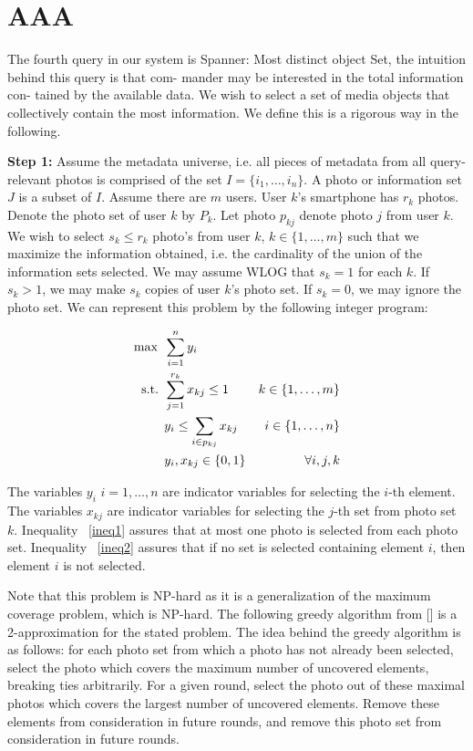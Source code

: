 \section{AAA}
The fourth query in our system is Spanner: Most distinct
object Set, the intuition behind this query is that com-
mander may be interested in the total information con-
tained by the available data. We wish to select a set of media
objects that collectively contain the most information. We define this is a rigorous way in the following.

\textbf{Step 1:} 
Assume the metadata universe, i.e. all pieces of metadata from all query-relevant photos is comprised of the set $I=\{i_1,\ldots,i_n\}$. A photo or information set $J$ is a subset of $I$.  Assume there are $m$ users.  User $k$'s smartphone has $r_k$ photos.  Denote the photo set of user $k$ by $P_k$. Let photo $p_{kj}$ denote photo $j$ from user $k$.  We wish to select $s_k\le r_k$ photo's from user $k$, $k\in\{1,\ldots,m\}$ such that we maximize the information obtained, i.e. the cardinality of the union of the information sets selected.  We may assume WLOG that $s_k=1$ for each $k$.  If $s_k>1$, we may make $s_k$ copies of user $k$'s photo set.  If $s_k=0$, we may ignore the photo set. We can represent this problem by the following integer program:


\begin{align}
\max \text{     }    & \notag
              \sum_{i=1}^n y_i \\
\text{s.t.     }  & \label{ineq1}
              \sum_{j=1}^{r_k} x_{kj}\le 1    & k\in \{1,\ldots ,m\} \\  
              & \label{ineq2}
              y_i\le \sum_{i\in p_{kj}} x_{kj}           & i\in\{1,\ldots ,n\} \\
              &\notag
             y_i, x_{kj} \in\{0,1\}        & \forall i,j,k\\
\end{align}

The variables $y_i$ $i=1,\ldots,n$ are indicator variables for selecting the $i$-th element.  The variables $x_{kj}$ are indicator variables for selecting the $j$-th set from photo set $k$.  Inequality ~\ref{ineq1} assures that at most one photo is selected from each photo set.  Inequality ~\ref{ineq2} assures that if no set is selected containing element $i$, then element $i$ is not selected.

Note that this problem is NP-hard as it is a generalization of the maximum coverage problem, which is NP-hard.
The following greedy algorithm from [] is a 2-approximation for the stated problem.  The idea behind the greedy algorithm is as follows: for each photo set from which a photo has not already been selected,  select the photo which covers the maximum number of uncovered elements, breaking ties arbitrarily. For a given round, select the photo out of these maximal photos which covers the largest number of uncovered elements.  Remove these elements from consideration in future rounds, and remove this photo set from consideration in future rounds.

